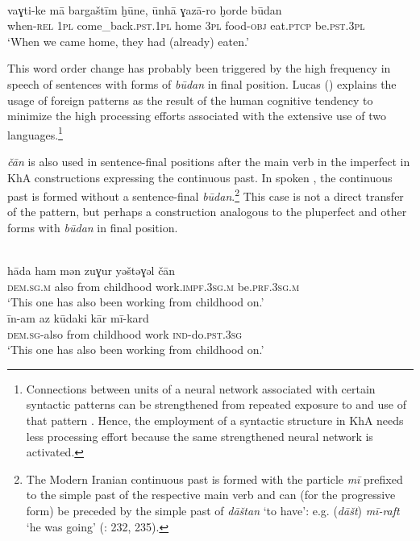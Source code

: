 \documentclass[output=paper,nonflat]{langsci/langscibook}
\begin{document}
\\
\gll vaɣti-ke mā bargaštīm ḫūne, ūnhā ɣazā-ro ḫorde būdan  \\
     when-\textsc{rel} \textsc{1pl} come\_back.\textsc{pst}.\textsc{1pl} home 3\textsc{pl} food-\textsc{obj} eat.\textsc{ptcp} be.\textsc{pst}.\textsc{3pl}\\
\glt ‘When we came home, they had (already) eaten.’
\z
\z

This {word order} change has probably been triggered by the high {frequency} in speech of  sentences with forms of \textit{būdan} in final position. Lucas (\citeyear[295]{Lucas2012}) explains the usage of foreign patterns as the result of the human cognitive tendency to minimize the high processing efforts associated with the extensive use of two languages.\footnote{{Connections between units of a neural network associated with certain syntactic patterns can be strengthened from repeated exposure to and use of that pattern} {\citep[291]{Lucas2012}. Hence, the employment of a  syntactic structure in KhA needs less processing effort because the same strengthened neural network is activated.}}

\textit{čān} is also used in sentence-final positions after the main verb in the imperfect in KhA constructions expressing the continuous past. In spoken , the continuous past is formed without a sentence-final \textit{būdan}.\footnote{The Modern Iranian  continuous past is formed with the particle \textit{mī} prefixed to the simple past of the respective main verb and can (for the progressive form) be preceded by the simple past of \textit{dāštan} ‘to have’: e.g. (\textit{dāšt}) \textit{mī-raft} ‘he was going’ (\citealt{Majidi1990}: 232, 235).} This case is not a direct {transfer} of the  pattern, but perhaps a construction analogous to the pluperfect and other  forms with \textit{būdan} in final position. 

\ea
{}\\
\gll hāda ham mən zuɣur yəštəɣəl čān  \\
     \textsc{dem}.\textsc{sg}.\textsc{m} also from childhood work.\textsc{impf.3sg.m} be.\textsc{prf.3sg.m}\\
\glt ‘This one has also been working from childhood on.’ 
\\
\gll īn-am az kūdaki kār mī-kard \\
     \textsc{dem.sg}-also from childhood work \textsc{ind}{}-do.\textsc{pst.3sg}\\
\glt ‘This one has also been working from childhood on.’
\z\z
\end{document}
